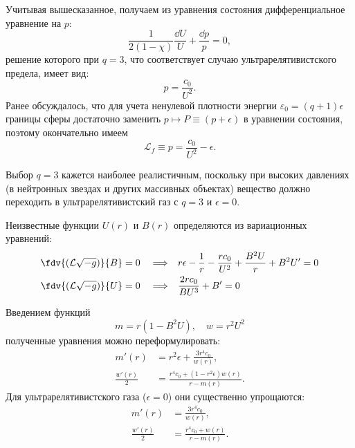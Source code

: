 \documentclass[\docroot/reports/draft/report.tex]{subfiles}
\begin{document}
    Учитывая вышесказанное, получаем из уравнения состояния дифференциальное уравнение на $p$:
    \begin{equation*}
        \frac{1}{2 (1 - \chi)} \frac{\dd{U}}{U} + \frac{\dd{p}}{p} = 0 ,
    \end{equation*}
    решение которого при $q = 3$, что соответствует случаю ультрарелятивистского предела, имеет вид:
    \begin{equation*}
        p = \frac{c_0}{U^2} .
    \end{equation*}
    Ранее обсуждалось, что для учета ненулевой плотности энергии $\varepsilon_0 = (q+1) \epsilon$ границы сферы достаточно заменить $p \mapsto P \equiv (p + \epsilon)$ в уравнении состояния, поэтому окончательно имеем
    \begin{equation*}
        \mathcal{L}_f \equiv p = \frac{c_0}{U^2} - \epsilon .
    \end{equation*}

    Выбор $q = 3$ кажется наиболее реалистичным, поскольку при высоких давлениях (в нейтронных звездах и других массивных объектах) вещество должно переходить в ультрарелятивистский газ \cite{oppenheimer_volkoff,burlankov_new_phys} с $q = 3$ и $\epsilon = 0$.

    Неизвестные функции $U(r)$ и $B(r)$ определяются из вариационных уравнений:
    \begin{align*}
        \fdv{(\mathcal{L}\sqrt{-g})}{B} = 0 \quad\Longrightarrow\quad&
            r \epsilon - \frac{1}{r} - \frac{r c_0}{U^2} + \frac{B^2 U}{r} + B^2 U' = 0 \\
        \fdv{(\mathcal{L}\sqrt{-g})}{U} = 0 \quad\Longrightarrow\quad&
            \frac{2 r c_0}{B U^3} + B' = 0
    \end{align*}

    Введением функций
    \begin{equation*}
        m = r (1 - B^2 U) , \quad w = r^2 U^2
    \end{equation*}
    полученные уравнения можно переформулировать:
    \begin{align*}
        m'(r) &= r^2 \epsilon + \frac{3 r^4 c_0}{w(r)} , \\
        \frac{w'(r)}{2} &= \frac{r^4 c_0 + (1 - r^2 \epsilon) w(r)}{r - m(r)} .
    \end{align*}
    Для ультрарелятивистского газа ($\epsilon = 0$) они существенно упрощаются:
    \begin{align*}
        m'(r) &= \frac{3 r^4 c_0}{w(r)} , \\
        \frac{w'(r)}{2} &= \frac{r^4 c_0 + w(r)}{r - m(r)} .
    \end{align*}

\end{document}
